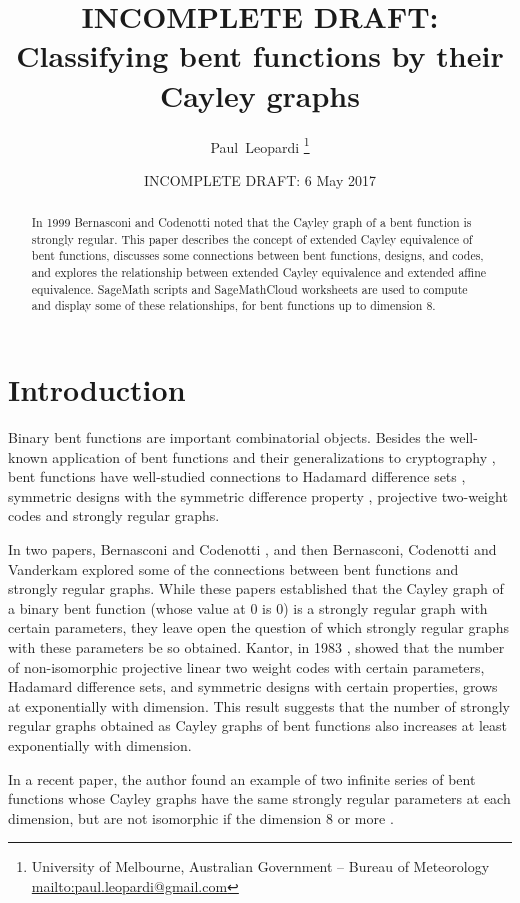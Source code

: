 \documentclass[12pt,a4paper]{article}
\title{INCOMPLETE DRAFT: \\
Classifying bent functions by their Cayley graphs}
\author{
Paul~Leopardi
\thanks{University of Melbourne, Australian Government -- Bureau of Meteorology
\protect\url{mailto:paul.leopardi@gmail.com}}
}
\date{INCOMPLETE DRAFT: 6 May 2017}
\begin{document}
\maketitle

\begin{abstract}
%
In 1999 Bernasconi and Codenotti noted that the Cayley graph of a bent function is strongly regular.
This paper describes the concept of extended Cayley equivalence of bent functions,
discusses some connections between bent functions, designs, and codes,
and explores the relationship between extended Cayley equivalence and extended affine equivalence.
SageMath scripts and SageMathCloud worksheets are used to compute and display some of these relationships,
for bent functions up to dimension 8.
%
\end{abstract}

\section{Introduction}
\label{sec-Introduction}
Binary bent functions are important combinatorial objects.
Besides the well-known application of bent functions and their generalizations to cryptography
\cite{Ada97} \cite[4.1-4.6]{Tok15bent},
bent functions have well-studied connections to Hadamard difference sets \cite{Dil74},
symmetric designs with the symmetric difference property \cite{DilS87block,Kan75symplectic},
projective two-weight codes \cite{DinD15class} and strongly regular graphs.

In two papers, Bernasconi and Codenotti \cite{BerC99}, and then Bernasconi, Codenotti and Vanderkam
\cite{BerCV01} explored some of the connections
between bent functions and strongly regular graphs.
While these papers established that the Cayley graph of a binary bent function (whose value at 0 is
0) is a strongly regular graph
with certain parameters, they leave open the question of which strongly regular graphs with these
parameters  be so obtained.
Kantor, in 1983 \cite{Kan83exponential}, showed that the number of non-isomorphic projective linear
two weight codes with certain parameters,
Hadamard difference sets, and symmetric designs with certain properties, grows at exponentially
with dimension.
This result suggests that the number of strongly regular graphs obtained as Cayley graphs of bent
functions also increases at least exponentially with dimension.

In a recent paper, the author found an example of two infinite series of bent functions whose
Cayley graphs have the same strongly regular parameters at each dimension,
but are not isomorphic if the dimension 8 or more \cite{Leo17Hurwitz}.
\end{document}
